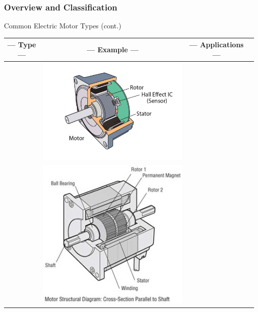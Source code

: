 \documentclass[fleqn]{beamer} %
\newcommand{\sectiontitleI}{Overview and Classification}
\begin{document}
	\begin{frame}[label=sectionI] \small
		\frametitle{\sectiontitleI}	
		
		Common Electric Motor Types (cont.) \vspace{2mm}\\

		\begin{tabular}{|c|c|c|c|} \hline
			--- Type --- & --- Example --- & --- Applications --- \\ \hline  
			& \includegraphics[scale=.2]{images/brushless-dc-motor-structure-and-control.jpg} & \\ \hline                %
			& \includegraphics[scale=.2]{images/stepper-motor-structural-diagram.jpg} & \\ \hline                    %
		\end{tabular}

	\end{frame}
\end{document}
